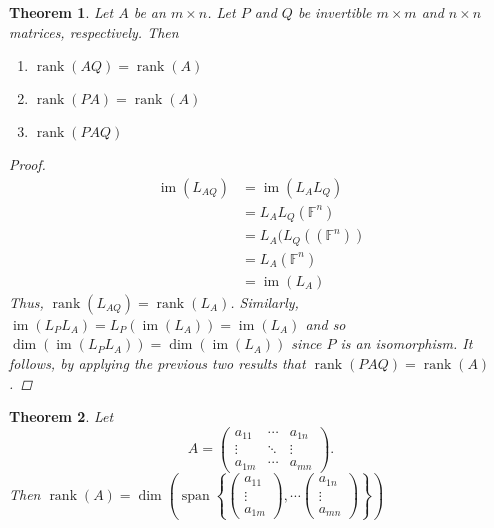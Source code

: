 \documentclass[oneside, 12pt]{book}
\DeclareMathOperator{\rank}{rank}
\DeclareMathOperator{\spn}{span}
\DeclareMathOperator{\im}{im}
\newtheorem{thm}{Theorem}[section]
\theoremstyle{definition}
\begin{document}
\begin{thm}
\label{thm_rnkprp}
  Let $A$ be an $m \times n$. Let $P$ and $Q$ be invertible $m \times m$ and $n \times n$ matrices, respectively.
  Then
  \begin{enumerate}
    \item $\rank(AQ)=\rank(A)$
    \item $\rank(PA)=\rank(A)$
    \item $\rank(PAQ)$
  \end{enumerate}
  \begin{proof}
    \begin{align}
      \im(L_{AQ})&=\im(L_{A}L_{Q}) \\
                 &= L_{A}L_{Q}(\mathbb{F}^{n}) \\
                 &= L_{A}(L_{Q}((\mathbb{F}^{n})) \\
                 &= L_{A}(\mathbb{F}^{n}) \\
                 &=\im(L_{A})
    \end{align}
    Thus, $\rank(L_{AQ})=\rank(L_{A})$.
    Similarly, $\im(L_{P}L_{A})=L_{P}(\im(L_{A}))=\im(L_{A})$
    and so $\dim(\im(L_{P}L_{A}))=\dim(\im(L_{A}))$ since $P$ is an isomorphism.
    It follows, by applying the previous two results that
    $\rank(PAQ)=\rank(A)$.
  \end{proof}
\end{thm}
\begin{thm}
\label{thm_colm}
Let \[A=\begin{pmatrix}
          a_{11} & \cdots & a_{1n} \\
          \vdots & \ddots & \vdots \\
          a_{1m} & \cdots & a_{mn}

        \end{pmatrix}.\] Then $\rank(A)=\dim \left(
        \spn{ \left \{
          \begin{pmatrix} a_{11} \\ \vdots \\ a_{1m}\end{pmatrix}, \cdots \begin{pmatrix} a_{1n}\\ \vdots \\ a_{mn} \end{pmatrix}
        \right \}
        }\right )
        $
\end{thm}
\end{document}
